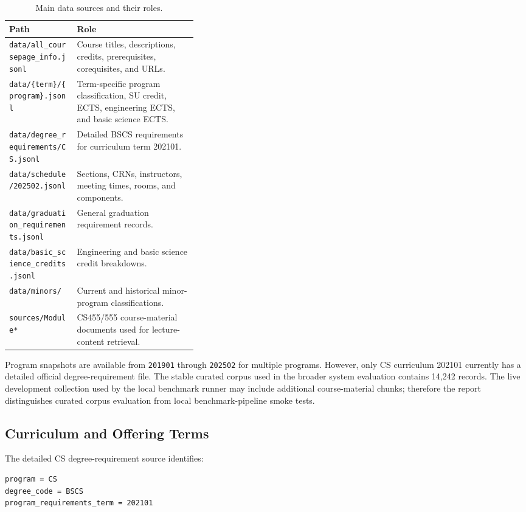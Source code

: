 \documentclass[10pt,a4paper]{article}
\newcommand{\code}[1]{\texttt{\small #1}}
\begin{document}
\begin{table}[H]
\centering
\caption{Main data sources and their roles.}
\label{tab:data}
\small
\begin{tabularx}{\linewidth}{p{0.36\linewidth}Y}
\toprule
\textbf{Path} & \textbf{Role}\\
\midrule
\code{data/all\_coursepage\_info.jsonl} & Course titles, descriptions, credits, prerequisites, corequisites, and URLs.\\
\code{data/\{term\}/\{program\}.jsonl} & Term-specific program classification, SU credit, ECTS, engineering ECTS, and basic science ECTS.\\
\code{data/degree\_requirements/CS.jsonl} & Detailed BSCS requirements for curriculum term 202101.\\
\code{data/schedule/202502.jsonl} & Sections, CRNs, instructors, meeting times, rooms, and components.\\
\code{data/graduation\_requirements.jsonl} & General graduation requirement records.\\
\code{data/basic\_science\_credits.jsonl} & Engineering and basic science credit breakdowns.\\
\code{data/minors/} & Current and historical minor-program classifications.\\
\code{sources/Module*} & CS455/555 course-material documents used for lecture-content retrieval.\\
\bottomrule
\end{tabularx}
\end{table}

Program snapshots are available from \code{201901} through \code{202502} for multiple programs. However, only CS curriculum 202101 currently has a detailed official degree-requirement file. The stable curated corpus used in the broader system evaluation contains 14,242 records. The live development collection used by the local benchmark runner may include additional course-material chunks; therefore the report distinguishes curated corpus evaluation from local benchmark-pipeline smoke tests.

\subsection{Curriculum and Offering Terms}

The detailed CS degree-requirement source identifies:

\begin{verbatim}
program = CS
degree_code = BSCS
program_requirements_term = 202101
\end{verbatim}
\end{document}
